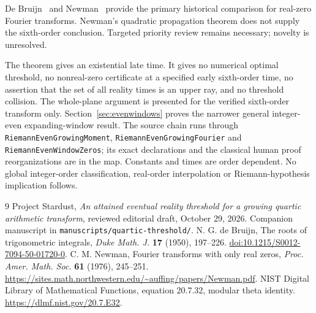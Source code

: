 \documentclass[11pt]{article}
\newcommand{\code}[1]{{\small\nolinkurl{#1}}}
\begin{document}
De Bruijn~\cite{debruijn} and Newman~\cite{newman} provide
the primary historical comparison for real-zero Fourier
transforms. Newman's quadratic propagation theorem does
not supply the sixth-order conclusion. Targeted priority
review remains necessary; novelty is unresolved.

The theorem gives an existential late time. It gives no
numerical optimal threshold, no nonreal-zero certificate at
a specified early sixth-order time, no assertion that the
set of all reality times is an upper ray, and no threshold
collision. The whole-plane argument is presented for the verified sixth-order transform only. Section~\ref{sec:evenwindows} proves the narrower general integer-even expanding-window result. The source chain runs through \code{RiemannEvenGrowingMoment}, \code{RiemannEvenGrowingFourier} and \code{RiemannEvenWindowZeros}; its exact declarations and the classical human proof reorganizations are in the map. Constants and times are order dependent. No global integer-order classification, real-order interpolation or Riemann-hypothesis implication follows.

\begin{thebibliography}{9}
 Project Stardust,
\emph{An attained eventual reality threshold for a growing
quartic arithmetic transform}, reviewed editorial draft,
October 29, 2026. Companion manuscript in
\code{manuscripts/quartic-threshold/}.
 N. G. de Bruijn,
The roots of trigonometric integrals,
\emph{Duke Math. J.} \textbf{17} (1950), 197--226.
\href{https://doi.org/10.1215/S0012-7094-50-01720-0}
{doi:10.1215/S0012-7094-50-01720-0}.
 C. M. Newman,
Fourier transforms with only real zeros,
\emph{Proc. Amer. Math. Soc.} \textbf{61} (1976), 245--251.
\url{https://sites.math.northwestern.edu/~auffing/papers/Newman.pdf}.
 NIST Digital Library of Mathematical Functions,
equation 20.7.32, modular theta identity.
\url{https://dlmf.nist.gov/20.7.E32}.
\end{thebibliography}
\end{document}
